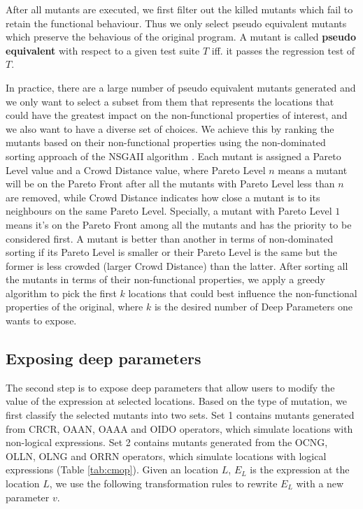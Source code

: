 After all mutants are executed, we first filter out the killed mutants which fail to retain the functional behaviour.  Thus we only select pseudo equivalent mutants which preserve the behavious of the original program. A mutant is called \textbf{pseudo equivalent} with respect to a given test suite $T$ iff. it passes the regression test of $T$.

In practice, there are a large number of pseudo equivalent mutants \cite{5477100} generated and we only want to select a subset from them that represents the locations that could have the greatest impact on the non-functional properties of interest, and we also want to have a diverse set of choices.  
We achieve this by ranking the mutants based on their non-functional properties using the non-dominated sorting approach of the NSGAII algorithm \cite{996017}. Each mutant is assigned a Pareto Level value and a Crowd Distance value, where Pareto Level $n$ means a mutant will be on the Pareto Front after all the mutants with Pareto Level less than $n$ are removed, while Crowd Distance indicates how close a mutant is to its neighbours on the same Pareto Level. Specially, a mutant with Pareto Level $1$ means it's on the Pareto Front among all the mutants and has the priority to be considered first. A mutant is better than another in terms of non-dominated sorting if its Pareto Level is smaller or their Pareto Level is the same but the former is less crowded (larger Crowd Distance) than the latter. After sorting all the mutants in terms of their non-functional properties, we apply a greedy algorithm to pick the first $k$ locations that could best influence the non-functional properties of the original, where $k$ is the desired number of Deep Parameters one wants to expose.

\subsection{Exposing deep parameters}
\label{exposing}
The second step is to expose deep parameters that allow users to modify the value of the expression at selected locations. Based on the type of mutation, we first classify the selected mutants into two sets. Set 1 contains mutants generated from CRCR, OAAN, OAAA and OIDO operators, which simulate locations with non-logical expressions. Set 2 contains mutants generated from the OCNG, OLLN, OLNG and ORRN operators, which simulate locations with logical expressions (Table \ref{tab:cmop}). 
Given an location $L$, $E_L$ is the expression at the location $L$, we use the following transformation rules to rewrite $E_L$ with a new parameter $v$.

